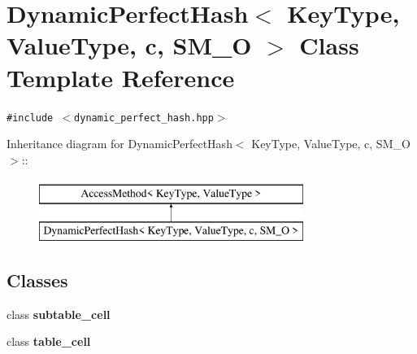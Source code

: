 \hypertarget{classDynamicPerfectHash}{
\section{DynamicPerfectHash$<$ KeyType, ValueType, c, SM\_\-O $>$ Class Template Reference}
\label{classDynamicPerfectHash}
}
{\tt \#include $<$dynamic\_\-perfect\_\-hash.hpp$>$}

Inheritance diagram for DynamicPerfectHash$<$ KeyType, ValueType, c, SM\_\-O $>$::\begin{figure}[H]
\begin{center}
\leavevmode
\includegraphics[height=2cm]{classDynamicPerfectHash}
\end{center}
\end{figure}
\subsection*{Classes}
\begin{CompactItemize}
\item 
class \textbf{subtable\_\-cell}
\item 
class \textbf{table\_\-cell}
\end{CompactItemize}
